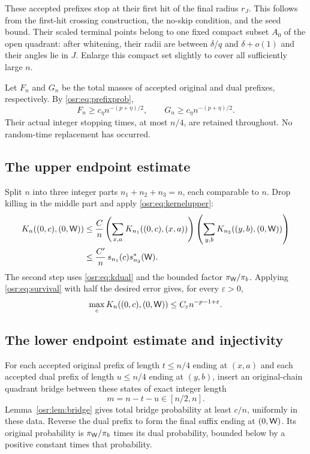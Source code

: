 \documentclass[11pt,letterpaper]{article}
\numberwithin{equation}{section}
\begin{document}
These accepted prefixes stop at their first hit of the final radius $r_J$. This follows from the first-hit crossing construction, the no-skip condition, and the seed bound. Their scaled terminal points belong to one fixed compact subset $A_0$ of the open quadrant: after whitening, their radii are between $\delta/q$ and $\delta+o(1)$ and their angles lie in $J$. Enlarge this compact set slightly to cover all sufficiently large $n$.

Let $F_n$ and $G_n$ be the total masses of accepted original and dual prefixes, respectively. By \eqref{osr:eq:prefixprob},
\begin{equation}\label{osr:eq:prefixmass}
 F_n\ge c_\eta n^{-(p+\eta)/2},\qquad
 G_n\ge c_\eta n^{-(p+\eta)/2}.
\end{equation}
Their actual integer stopping times, at most $n/4$, are retained throughout. No random-time replacement has occurred.

\subsection{The upper endpoint estimate}
Split $n$ into three integer parts $n_1+n_2+n_3=n$, each comparable to $n$. Drop killing in the middle part and apply \eqref{osr:eq:kernelupper}:
\begin{align*}
 K_n((0,c),(0,\mathsf W))
 &\le\frac Cn
  \left(\sum_{x,a}K_{n_1}((0,c),(x,a))\right)
  \left(\sum_{y,b}K_{n_3}((y,b),(0,\mathsf W))\right)\\
 &\le\frac{C'}n\,s_{n_1}(c)s_{n_3}^*(\mathsf W).
\end{align*}
The second step uses \eqref{osr:eq:kdual} and the bounded factor $\pi_\mathsf W/\pi_b$. Applying \eqref{osr:eq:survival} with half the desired error gives, for every $\varepsilon>0$,
\begin{equation}\label{osr:eq:upperendpoint}
 \max_c K_n((0,c),(0,\mathsf W))\le C_\varepsilon n^{-p-1+\varepsilon}.
\end{equation}

\subsection{The lower endpoint estimate and injectivity}
For each accepted original prefix of length $t\le n/4$ ending at $(x,a)$ and each accepted dual prefix of length $u\le n/4$ ending at $(y,b)$, insert an original-chain quadrant bridge between these states of exact integer length
\[
 m=n-t-u\in[n/2,n].
\]
Lemma~\ref{osr:lem:bridge} gives total bridge probability at least $c/n$, uniformly in these data. Reverse the dual prefix to form the final suffix ending at $(0,\mathsf W)$. Its original probability is $\pi_\mathsf W/\pi_b$ times its dual probability, bounded below by a positive constant times that probability.
\end{document}
